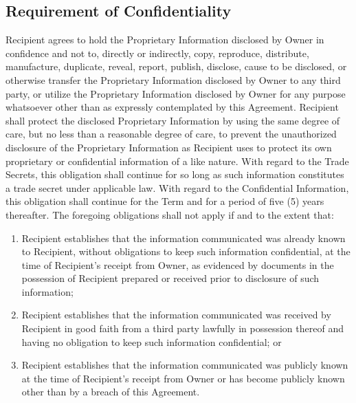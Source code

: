 \documentclass[letterpaper,10pt,openany,oneside,english]{sphinxmanual}
\begin{document}
\subsection{Requirement of Confidentiality}
\label{\detokenize{nondisclosure:requirement-of-confidentiality}}
Recipient agrees to hold the Proprietary Information disclosed by Owner in confidence and not to, directly or indirectly, copy, reproduce, distribute, manufacture, duplicate, reveal, report, publish, disclose, cause to be disclosed, or otherwise transfer the Proprietary Information disclosed by Owner to any third party, or utilize the Proprietary Information disclosed by Owner for any purpose whatsoever other than as expressly contemplated by this Agreement. Recipient shall protect the disclosed Proprietary Information by using the same degree of care, but no less than a reasonable degree of care, to prevent the unauthorized disclosure of the Proprietary Information as Recipient uses to protect its own proprietary or confidential information of a like nature.  With regard to the Trade Secrets, this obligation shall continue for so long as such information constitutes a trade secret under applicable law. With regard to the Confidential Information, this obligation shall continue for the Term and for a period of five (5) years thereafter. The foregoing obligations shall not apply if and to the extent that:
\begin{enumerate}
\item {} 
Recipient establishes that the information communicated was already known to Recipient, without obligations to keep such information confidential, at the time of Recipient’s receipt from Owner, as evidenced by documents in the possession of Recipient prepared or received prior to disclosure of such information;

\item {} 
Recipient establishes that the information communicated was received by Recipient in good faith from a third party lawfully in possession thereof and having no obligation to keep such information confidential; or

\item {} 
Recipient establishes that the information communicated was publicly known at the time of Recipient’s receipt from Owner or has become publicly known other than by a breach of this Agreement.

\end{enumerate}
\end{document}
